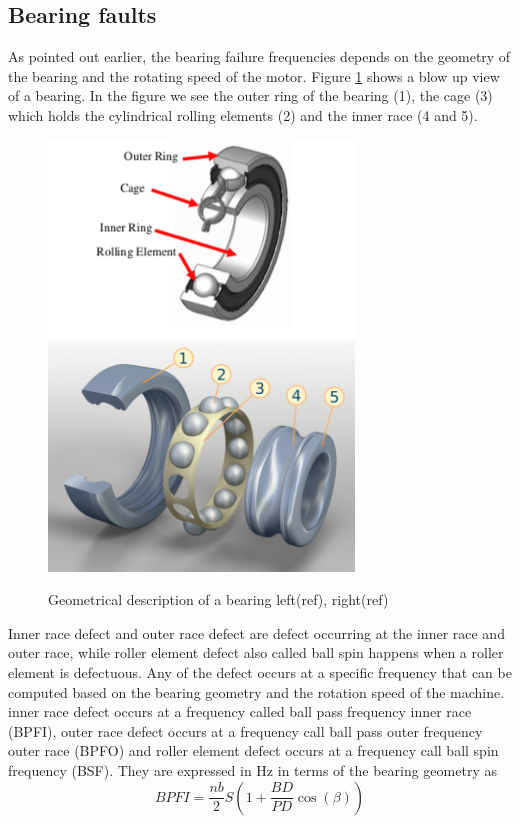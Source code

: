 \documentclass[../Main/thesis.tex]{subfiles}
\begin{document}
\subsection{Bearing faults}
As pointed out earlier, the bearing failure frequencies depends on the geometry of the bearing and the rotating speed of the motor. Figure \ref{fig:bearing} shows a blow up view of a bearing. In the figure we see the outer ring of the bearing (1), the cage (3) which holds the cylindrical rolling elements (2) and the inner race (4 and 5).
\begin{figure}[H] %
   \centering
   \includegraphics[width=3.2in]{../fig/bearing} 
    \includegraphics[width=3.2in]{../fig/bearing-s} 
   \caption{Geometrical description of a bearing left(ref), right(ref)}
   \label{fig:bearing}
\end{figure}
\justify
Inner race defect and outer race defect are defect occurring at the inner race and outer race, while roller element defect also called ball spin happens when a roller element is defectuous. Any of the defect occurs at a specific frequency that can be computed based on the bearing geometry and the rotation speed of the machine. inner race defect occurs at a frequency called ball pass frequency inner race (BPFI), outer race defect occurs at a frequency call ball pass outer frequency outer race (BPFO) and roller element defect occurs at a frequency call ball spin frequency (BSF). They are expressed in Hz in terms of the bearing geometry as 
\begin{equation}\label{eq:bpfi}
BPFI = \frac{nb}{2}S\left( 1 +  \frac{BD}{PD}\cos(\beta)  \right)
\end{equation}
\end{document}

